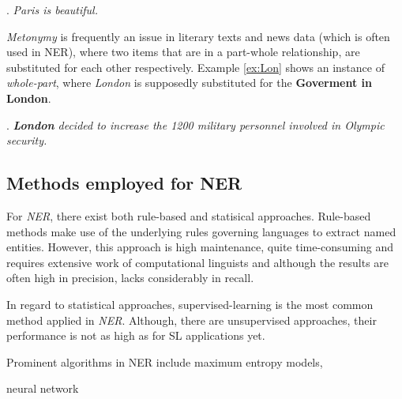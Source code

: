 \documentclass[11pt]{article}
\begin{document}
\ex. \emph{Paris is beautiful.} \label{ex:Paris}

\emph{Metonymy} is frequently an issue in literary texts and news data (which is often used in NER), where two items that are in a part-whole
relationship, are substituted for each other respectively. Example \ref{ex:Lon} shows an instance of \emph{whole-part}, where \emph{London} is supposedly substituted
for the \textbf{Goverment in London}. 

\ex. \emph{\textbf{London} decided to increase the 1200 military personnel involved in Olympic security.} \label{ex:Lon}

\subsection*{Methods employed for NER}
For \emph{NER}, there exist both rule-based and statisical approaches. 
Rule-based methods make use of the underlying rules governing languages to extract named entities. 
However, this approach is high maintenance, quite time-consuming and requires extensive work of computational linguists \cite{nadeau2007survey}
and although the results are often high in precision, lacks considerably in recall.

In regard to statistical approaches, supervised-learning is the most common method applied in \emph{NER}. Although, there are unsupervised approaches, 
their performance is not as high as for SL applications yet.

Prominent algorithms in NER include maximum entropy models, 

neural network
\end{document}
